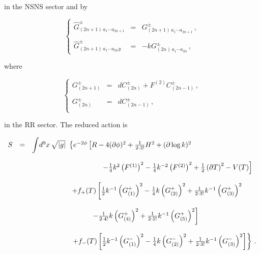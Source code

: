 \documentclass[12pt,a4paper]{article}
\begin{document}
\noindent in the NSNS sector and by 

\begin{equation}
\left\{
\begin{array}{rcl}
\hat{G}^{\pm}_{(2n+1)\, a_{1}\cdots a_{2n+1}} & = & 
G^{\pm}_{(2n+1)\, a_{1}\cdots a_{2n+1}}\, ,\\
& & \\
\hat{G}^{\pm}_{(2n+1)\, a_{1}\cdots a_{2n}y} & = & 
-kG^{\pm}_{(2n)\, a_{1}\cdots a_{2n}}\, ,
\end{array}
\right.
\end{equation}

\noindent where

\begin{equation}
\label{eq:9dRRfieldstrengths0B-1}
\left\{
\begin{array}{lcl}
G^{\pm}_{(2n+1)} & = & dC^{\pm}_{(2n)} +F^{(2)} C^{\pm}_{(2n-1)}\, ,\\
& & \\
G^{\pm}_{(2n)} & = & dC^{\pm}_{(2n-1)}\, ,\\
\end{array}
\right.
\end{equation}

\noindent in the RR sector. The reduced action is 

\begin{equation}
\begin{array}{rcl}
S & = & {\displaystyle\int} d^{9}x\,  \sqrt{|g|}\ 
\left\{ e^{-2\phi}
\left[R -4(\partial\phi)^{2} +{\textstyle\frac{1}{2\cdot 3!}}H^{2}
+(\partial\log{k})^{2} 
\right.
\right.\\
& & \\
& &
\hspace{3.5cm}
\left.
-{\textstyle\frac{1}{4}}k^{2} \left(F^{(1)}\right)^{2} 
-{\textstyle\frac{1}{4}}k^{-2}\left(F^{(2)}\right)^{2}
+\textstyle{\frac{1}{2}}\left(\partial T\right)^{2} -V(T)
\right]
\\
& & \\
& & 
\hspace{2cm}
+f_{+}(T)
\left[\frac{1}{2}k^{-1}\left(G_{(1)}^{+}\right)^{2} 
-\frac{1}{4}k\left(G_{(2)}^{+}\right)^{2} 
+\frac{1}{2\cdot 3!}k^{-1}\left(G_{(3)}^{+}\right)^{2}
\right.
\\
& & \\
& & 
\hspace{3cm}
\left.
-\frac{1}{2\cdot 4!}k\left(G_{(4)}^{+}\right)^{2}
+\frac{1}{2\cdot 5!}k^{-1}\left(G_{(5)}^{+}\right)^{2}
\right]\\
& & \\
& & 
\hspace{2cm}
\left.
+f_{-}(T)
\left[
\frac{1}{2}k^{-1}\left(G_{(1)}^{-}\right)^{2} 
-\frac{1}{4}k\left(G_{(2)}^{-}\right)^{2} 
+\frac{1}{2\cdot 3!}k^{-1}\left(G_{(3)}^{-}\right)^{2}
\right]
\right\}\, .\\
\end{array}
\label{eq:0Baction9d-1}
\end{equation}
\end{document}
